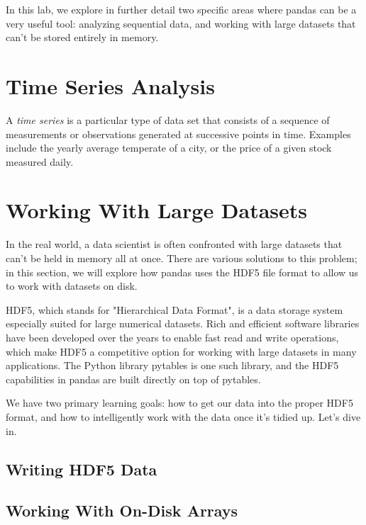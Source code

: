 
In this lab, we explore in further detail two specific areas where pandas can be a very useful tool:
analyzing sequential data, and working with large datasets that can't be stored entirely in memory. 
\section*{Time Series Analysis}
A \emph{time series} is a particular type of data set that consists of a sequence of measurements or observations 
generated at successive points in time. Examples include the yearly average temperate of a city, or
the price of a given stock measured daily. 
\section*{Working With Large Datasets}
In the real world, a data scientist is often confronted with large datasets that can't be held in memory all at once.
There are various solutions to this problem; in this section, we will explore how pandas uses the HDF5 file format
to allow us to work with datasets on disk. 

HDF5, which stands for "Hierarchical Data Format", is a data storage system especially suited for large numerical datasets.
Rich and efficient software libraries have been developed over the years to enable fast read and write operations,
which make HDF5 a competitive option for working with large datasets in many applications. The Python library pytables
is one such library, and the HDF5 capabilities in pandas are built directly on top of pytables. 

We have two primary learning goals: how to get our data into the proper HDF5 format, and how to intelligently work with
the data once it's tidied up. Let's dive in.
\subsection*{Writing HDF5 Data}

\subsection*{Working With On-Disk Arrays}

